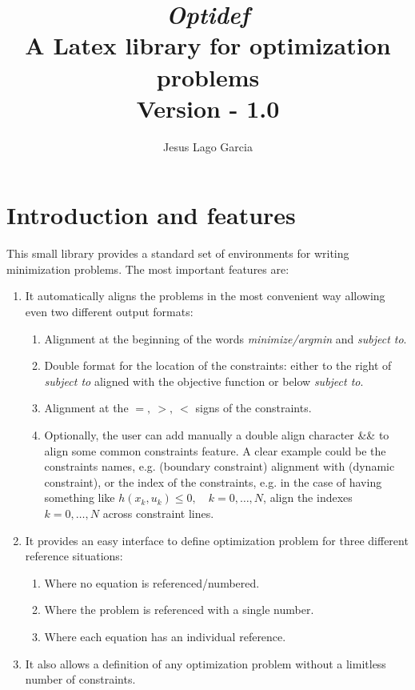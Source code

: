 \documentclass[]{report}
\title{\textit{\textbf{Optidef}} \\ A Latex library for optimization problems\\ \textnormal{Version - 1.0}}
\author{Jesus Lago Garcia}
\begin{document}
\maketitle

\section{Introduction and features}

This small library provides a standard set of environments for writing minimization problems. The most important features are:
\begin{enumerate}
	\item It automatically aligns the problems in the most convenient way allowing even two different output formats:
		\begin{enumerate}
			\item Alignment at the beginning of the words \textit{minimize/argmin} and \textit{subject to}.
			\item Double format for the location of the constraints: either to the right of  \textit{subject to} aligned with the objective function or below \textit{subject to}.
			\item Alignment at the $=,~>,~<$ signs of the constraints.
			\item Optionally, the user can add manually a double align character \&\& to align some common constraints feature. A clear example could be the constraints names, e.g. (boundary constraint) alignment with (dynamic constraint), or the index of the constraints, e.g. in the case of having something like $h(x_k,u_k)\leq 0,\quad k=0,\ldots,N$, align the indexes $k=0,\ldots,N$ across constraint lines.
		\end{enumerate}

\item It provides an easy interface to define optimization problem for three different reference situations:
\begin{enumerate}
	\item Where no equation is referenced/numbered.
	\item Where the problem is referenced with a single number.
	\item Where each equation has an individual reference.
\end{enumerate} 

\item It also allows a definition of any optimization problem without a limitless number of constraints.

\end{enumerate}
\end{document}
